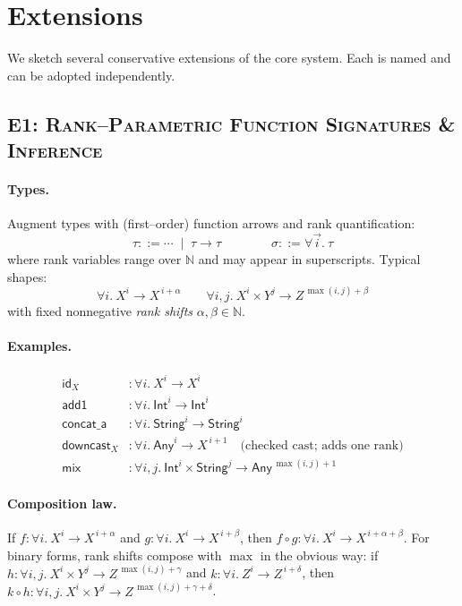 \section{Extensions}
\label{sec:extensions}

We sketch several conservative extensions of the core system. Each is named and can be adopted independently.

\subsection{\textsc{E1: Rank–Parametric Function Signatures \& Inference}}
\paragraph{Types.}
Augment types with (first–order) function arrows and rank quantification:
\[
\tau ::= \cdots \;\mid\; \tau \to \tau 
\qquad\qquad
\sigma ::= \forall \vec{i}.\ \tau
\]
where rank variables range over $\mathbb{N}$ and may appear in superscripts.
Typical shapes:
\[
\forall i.\ X^{i} \to X^{\,i+\alpha}
\qquad
\forall i,j.\ X^{i}\times Y^{j} \to Z^{\,\max(i,j)+\beta}
\]
with fixed nonnegative \emph{rank shifts} $\alpha,\beta \in \mathbb{N}$.

\paragraph{Examples.}
\begin{align*}
\textsf{id}_X &: \forall i.\ X^{i} \to X^{i} 
\\
\textsf{add1} &: \forall i.\ \textsf{Int}^{i} \to \textsf{Int}^{i}
\\
\textsf{concat\_a} &: \forall i.\ \textsf{String}^{i} \to \textsf{String}^{i}
\\
\textsf{downcast}_X &: \forall i.\ \textsf{Any}^{i} \to X^{\,i+1} \quad\text{(checked cast; adds one rank)}
\\
\textsf{mix} &: \forall i,j.\ \textsf{Int}^{i}\times \textsf{String}^{j} \to \textsf{Any}^{\,\max(i,j)+1}
\end{align*}

\paragraph{Composition law.}
If $f:\forall i.\ X^{i}\!\to\! X^{\,i+\alpha}$ and $g:\forall i.\ X^{i}\!\to\! X^{\,i+\beta}$,
then $f\circ g:\forall i.\ X^{i}\!\to\! X^{\,i+\alpha+\beta}$.
For binary forms, rank shifts compose with $\max$ in the obvious way:
if $h:\forall i,j.\ X^{i}\times Y^{j}\to Z^{\,\max(i,j)+\gamma}$ and
$k:\forall i.\ Z^{i}\to Z^{\,i+\delta}$, then
$k\circ h:\forall i,j.\ X^{i}\times Y^{j}\to Z^{\,\max(i,j)+\gamma+\delta}$.

